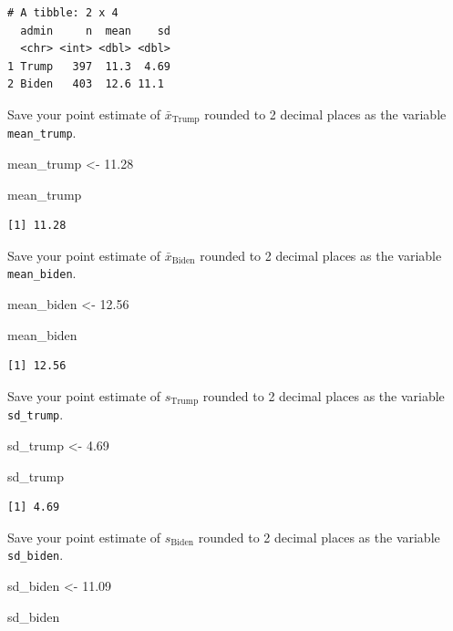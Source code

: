 \documentclass[
  letterpaper,
  DIV=11,
  numbers=noendperiod]{scrartcl}
\newenvironment{Shaded}{\begin{snugshade}}{\end{snugshade}}
\newcommand{\FloatTok}[1]{\textcolor[rgb]{0.68,0.00,0.00}{#1}}
\newcommand{\NormalTok}[1]{\textcolor[rgb]{0.00,0.23,0.31}{#1}}
\newcommand{\OtherTok}[1]{\textcolor[rgb]{0.00,0.23,0.31}{#1}}
\begin{document}
\begin{verbatim}
# A tibble: 2 x 4
  admin     n  mean    sd
  <chr> <int> <dbl> <dbl>
1 Trump   397  11.3  4.69
2 Biden   403  12.6 11.1 
\end{verbatim}

Save your point estimate of \(\bar{x}_{\text{Trump}}\) rounded to 2
decimal places as the variable \texttt{mean\_trump}.

\begin{Shaded}
\begin{Highlighting}[]
\NormalTok{mean\_trump }\OtherTok{\textless{}{-}} \FloatTok{11.28}

\NormalTok{mean\_trump}
\end{Highlighting}
\end{Shaded}

\begin{verbatim}
[1] 11.28
\end{verbatim}

Save your point estimate of \(\bar{x}_{\text{Biden}}\) rounded to 2
decimal places as the variable \texttt{mean\_biden}.

\begin{Shaded}
\begin{Highlighting}[]
\NormalTok{mean\_biden }\OtherTok{\textless{}{-}} \FloatTok{12.56}

\NormalTok{mean\_biden}
\end{Highlighting}
\end{Shaded}

\begin{verbatim}
[1] 12.56
\end{verbatim}

Save your point estimate of \(s_{\text{Trump}}\) rounded to 2 decimal
places as the variable \texttt{sd\_trump}.

\begin{Shaded}
\begin{Highlighting}[]
\NormalTok{sd\_trump }\OtherTok{\textless{}{-}} \FloatTok{4.69}

\NormalTok{sd\_trump}
\end{Highlighting}
\end{Shaded}

\begin{verbatim}
[1] 4.69
\end{verbatim}

Save your point estimate of \(s_{\text{Biden}}\) rounded to 2 decimal
places as the variable \texttt{sd\_biden}.

\begin{Shaded}
\begin{Highlighting}[]
\NormalTok{sd\_biden }\OtherTok{\textless{}{-}} \FloatTok{11.09}

\NormalTok{sd\_biden}
\end{Highlighting}
\end{Shaded}
\end{document}
